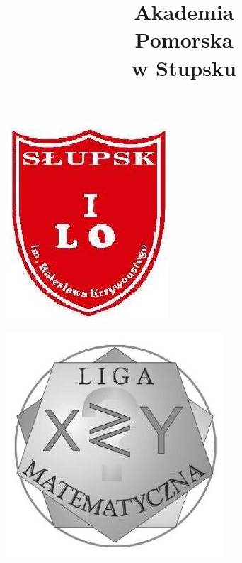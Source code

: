\documentclass[10pt]{article}
\title{Akademia \\
 Pomorska \\
 w Stupsku }
\author{}
\date{}
\begin{document}
\maketitle
\begin{center}
\includegraphics[max width=\textwidth]{2024_11_21_c34ca8452b5408709ed6g-1}
\end{center}

\begin{center}
\includegraphics[max width=\textwidth]{2024_11_21_c34ca8452b5408709ed6g-1(1)}
\end{center}
\end{document}
